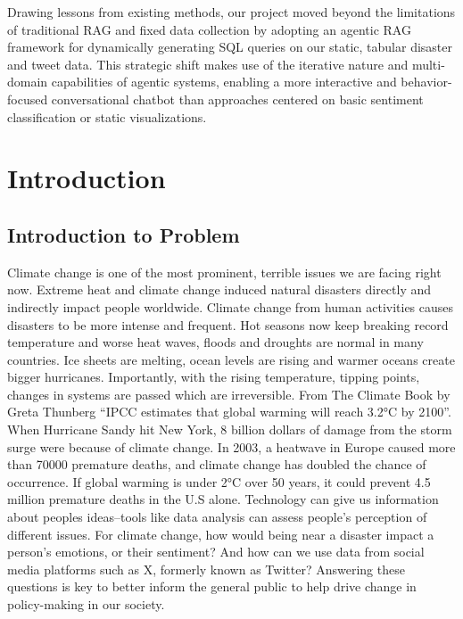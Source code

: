 \documentclass[pdflatex,sn-mathphys-num]{sn-jnl}%
\theoremstyle{thmstyleone}%
\theoremstyle{thmstyletwo}%
\theoremstyle{thmstylethree}%
\begin{document}
Drawing lessons from existing methods, our project moved beyond the limitations of traditional RAG and fixed data collection by adopting an agentic RAG framework for dynamically generating SQL queries on our static, tabular disaster and tweet data. This strategic shift makes use of the iterative nature and multi-domain capabilities of agentic systems, enabling a more interactive and behavior-focused conversational chatbot than approaches centered on basic sentiment classification or static visualizations.


\section{Introduction}\label{sec1}
\subsection{Introduction to Problem}\label{subsec2}
Climate change is one of the most prominent, terrible issues we are facing right now. Extreme heat and climate change induced natural disasters directly and indirectly impact people worldwide.
Climate change from human activities causes disasters to be more intense and frequent. Hot seasons now keep breaking record temperature and worse heat waves, floods and droughts are normal in many countries. Ice sheets are melting, ocean levels are rising and warmer oceans create bigger hurricanes. Importantly, with the rising temperature, tipping points, changes in systems are passed which are irreversible. From The Climate Book by Greta Thunberg “IPCC estimates that global warming will reach 3.2°C by 2100”. When Hurricane Sandy hit New York, 8 billion dollars of damage from the storm surge were because of climate change. In 2003, a heatwave in Europe caused more than 70000 premature deaths, and climate change has doubled the chance of occurrence. If global warming is under 2°C over 50 years, it could prevent 4.5 million premature deaths in the U.S alone.
Technology can give us information about peoples ideas–tools like data analysis can assess people’s perception of different issues. For climate change, how would being near a disaster impact a person's emotions, or their sentiment? And how can we use data from social media platforms such as X, formerly known as Twitter?  Answering these questions is key to better inform the general public to help drive change in policy-making in our society. 
\end{document}
